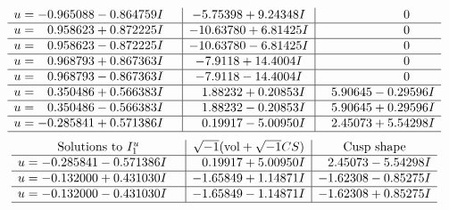 \documentclass[1p]{elsarticle_modified}
\theoremstyle{definition}
\newcommand{\I}{\sqrt{-1}}
\begin{document}
$$\begin{array}{c|c|c}
\begin{aligned}
u &= -0.965088 - 0.864759 I\end{aligned}
 & -5.75398 + 9.24348 I & \phantom{-0.000000 } 0 \\ \hline\begin{aligned}
u &= \phantom{-}0.958623 + 0.872225 I\end{aligned}
 & -10.63780 + 6.81425 I & \phantom{-0.000000 } 0 \\ \hline\begin{aligned}
u &= \phantom{-}0.958623 - 0.872225 I\end{aligned}
 & -10.63780 - 6.81425 I & \phantom{-0.000000 } 0 \\ \hline\begin{aligned}
u &= \phantom{-}0.968793 + 0.867363 I\end{aligned}
 & -7.9118 + 14.4004 I & \phantom{-0.000000 } 0 \\ \hline\begin{aligned}
u &= \phantom{-}0.968793 - 0.867363 I\end{aligned}
 & -7.9118 - 14.4004 I & \phantom{-0.000000 } 0 \\ \hline\begin{aligned}
u &= \phantom{-}0.350486 + 0.566383 I\end{aligned}
 & \phantom{-}1.88232 + 0.20853 I & \phantom{-}5.90645 - 0.29596 I \\ \hline\begin{aligned}
u &= \phantom{-}0.350486 - 0.566383 I\end{aligned}
 & \phantom{-}1.88232 - 0.20853 I & \phantom{-}5.90645 + 0.29596 I \\ \hline\begin{aligned}
u &= -0.285841 + 0.571386 I\end{aligned}
 & \phantom{-}0.19917 - 5.00950 I & \phantom{-}2.45073 + 5.54298 I\\
 \hline 
 \end{array}$$\newpage$$\begin{array}{c|c|c}  
\text{Solutions to }I^u_{1}& \I (\text{vol} + \sqrt{-1}CS) & \text{Cusp shape}\\
 \hline 
\begin{aligned}
u &= -0.285841 - 0.571386 I\end{aligned}
 & \phantom{-}0.19917 + 5.00950 I & \phantom{-}2.45073 - 5.54298 I \\ \hline\begin{aligned}
u &= -0.132000 + 0.431030 I\end{aligned}
 & -1.65849 + 1.14871 I & -1.62308 - 0.85275 I \\ \hline\begin{aligned}
u &= -0.132000 - 0.431030 I\end{aligned}
 & -1.65849 - 1.14871 I & -1.62308 + 0.85275 I\\
 \hline 
 \end{array}$$\newpage
\end{document}
